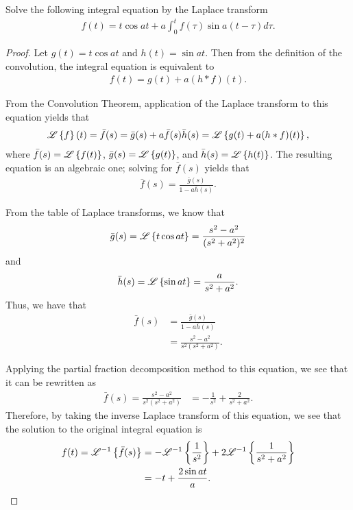 \begin{problem}{5}
  Solve the following integral equation by the Laplace transform
  \begin{align*}
    f(t) = t\cos at + a \int_0^t f(\tau)\sin a(t-\tau) d\tau.
  \end{align*}
\end{problem}

\begin{proof}
  Let $g(t) = t \cos a t$ and $h(t) = \sin a t$. Then from the definition of the convolution,
  the integral equation is equivalent to
  \begin{align*}
    f(t) = g(t) + a (h \ast f)(t).
  \end{align*}

  From the Convolution Theorem, application of the Laplace transform to this equation yields that
  \begin{align*}
    \mathscr{L}\left\{ {f} \right\}(t) = \bar{f}(s) = \bar{g}(s) + a \bar{f}(s)\bar{h}(s) = \mathscr{L}\left\{ {g(t) + a (h \ast f)(t)} \right\},
  \end{align*}
  where $\bar{f}(s) = \mathscr{L}\left\{ {f(t)} \right\}$, $\bar{g}(s) = \mathscr{L}\left\{ {g(t)} \right\}$, and $\bar{h}(s) = \mathscr{L}\left\{ {h(t)} \right\}$.
  The resulting equation is an algebraic one; solving for $\bar{f}(s)$ yields that
  \begin{align*}
    \bar{f}(s) = \frac{\bar{g}(s)}{1- a\bar{h}(s)}.
  \end{align*}

  From the table of Laplace transforms, we know that
  \begin{align*}
    \bar{g}(s) = \mathscr{L}\left\{ {t \cos a t} \right\} = \frac{s^2 - a^2}{(s^2+a^2)^2}
  \end{align*}
  and
  \begin{align*}
    \bar{h}(s) = \mathscr{L}\left\{ {\sin a t} \right\} = \frac{a}{s^2+a^2}.
  \end{align*}
  Thus, we have that
  \begin{align*}
    \bar{f}(s) &= \frac{\bar{g}(s)}{1 -a\bar{h}(s) } \\
    &= \frac{s^2 - a^2}{s^2(s^2 + a^2)}.
  \end{align*}

  Applying the partial fraction decomposition method to this equation, we see that it can be rewritten as
  \begin{align*}
    \bar{f}(s)
    = \frac{s^2 - a^2}{s^2(s^2 + a^2)}
    &= -\frac{1}{s^2} + \frac{2}{s^2+a^2}.
  \end{align*}
  Therefore, by taking the inverse Laplace transform of this equation, we see that
  the solution to the original integral equation is
  \begin{align*}
    f(t) = \mathscr{L}^{-1}\left\{ {\bar{f}(s)} \right\}
    &= -\mathscr{L}^{-1}\left\{ {\frac{1}{s^2}} \right\} + 2\mathscr{L}^{-1}\left\{ {\frac{1}{s^2+a^2}} \right\} \\
    &= -t + \frac{2\sin a t}{a}.
  \end{align*}
\end{proof}
\newpage
